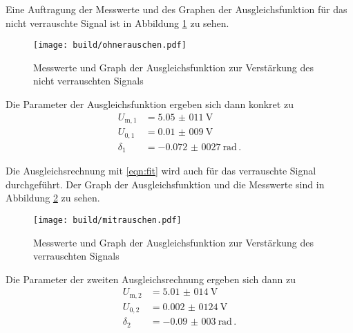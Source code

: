 Eine Auftragung der Messwerte und des Graphen der Ausgleichsfunktion für das nicht
verrauschte Signal ist in Abbildung \ref{fig:nichtrausch} zu sehen.

\begin{figure}
  \centering
  \texttt{[image: build/ohnerauschen.pdf]}
  \caption{Messwerte und Graph der Ausgleichsfunktion zur Verstärkung des nicht verrauschten Signals}
  \label{fig:nichtrausch}
\end{figure}

Die Parameter der Ausgleichsfunktion ergeben sich dann konkret zu
\begin{align*}
  U_\mathrm{m,1} &= \SI{5,05(011)}{\volt} \,\\
  U_{0,1} &= \SI{0,01(009)}{\volt} \,\\
  \delta_1 &= \SI{-0,072(0027)}{\radian} \,.
\end{align*}

Die Ausgleichsrechnung mit \eqref{eqn:fit} wird auch für das verrauschte Signal durchgeführt.
Der Graph der Ausgleichsfunktion und die Messwerte sind in Abbildung \ref{fig:rausch}
zu sehen.

\begin{figure}
  \centering
  \texttt{[image: build/mitrauschen.pdf]}
  \caption{Messwerte und Graph der Ausgleichsfunktion zur Verstärkung des verrauschten Signals}
  \label{fig:rausch}
\end{figure}

Die Parameter der zweiten Ausgleichsrechnung ergeben sich dann zu
\begin{align*}
  U_\mathrm{m,2} &= \SI{5,01(014)}{\volt} \,\\
  U_{0,2} &= \SI{0,002(0124)}{\volt} \,\\
  \delta_2 &= \SI{-0,09(003)}{\radian} \,.
\end{align*}
